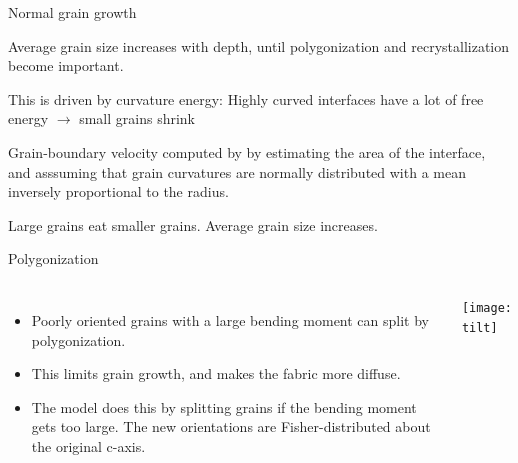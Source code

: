 \documentclass{beamer}
\begin{document}
\begin{frame}{Normal grain growth}
   \begin{itemize} \small{
      \item Average grain size increases with depth, until polygonization and recrystallization become important.
      \item This is driven by curvature energy: Highly curved interfaces have a lot of free energy $\rightarrow$ small grains shrink
      \item Grain-boundary velocity computed by by estimating the area of the interface, and asssuming that grain curvatures are normally distributed with a mean inversely proportional to the radius.
      \item Large grains eat smaller grains. Average grain size increases.
      }
   \end{itemize}



\end{frame}


\begin{frame}{Polygonization}
\begin{columns}[T]
   \begin{itemize}
      \item Poorly oriented grains with a large bending moment can split by polygonization. 
      \item This limits grain growth, and makes the fabric more diffuse.
      \item The model does this by splitting grains if the bending moment gets too large. The new orientations are Fisher-distributed about the original c-axis.
   \end{itemize}
   \texttt{[image: tilt]}
\end{columns}
\end{frame}
\end{document}
